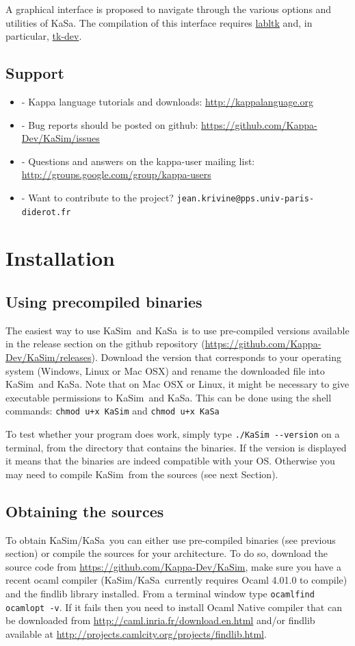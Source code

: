 \documentclass[11pt]{book}
\def\KaSim{\textsf{KaSim}}
\def\KaSa{\textsf{KaSa}}
\def\ttt#1{\texttt{#1}}
\def\ITE#1{\begin{itemize}#1\end{itemize}}
\def\dd{-\hspace{0.001cm}-}
\begin{document}
A graphical interface is proposed to navigate through the various options and utilities  of \KaSa. The compilation of this interface requires \href{https://forge.ocamlcore.org/projects/labltk/}{labltk} and, in particular,  \href{http://www.tcl.tk/}{tk-dev}.


\section{Support}
\ITE{
\item[-] Kappa language tutorials and downloads: \url{http://kappalanguage.org}
\item[-] Bug reports should be posted on github: \url{https://github.com/Kappa-Dev/KaSim/issues}
\item[-] Questions and answers on the kappa-user mailing list: \url{http://groups.google.com/group/kappa-users}
\item[-] Want to contribute to the project? \ttt{jean.krivine@pps.univ-paris-diderot.fr}
}

\chapter{Installation}\label{chap:install}

\section{Using precompiled binaries}
The easiest way to use \KaSim~and \KaSa~is to use pre-compiled versions available in the release section on the github repository (\url{https://github.com/Kappa-Dev/KaSim/releases}). Download the version that corresponds to your operating system (Windows, Linux or Mac OSX) and rename the downloaded file into \KaSim~and \KaSa. Note that on Mac OSX or Linux, it might be necessary to give executable permissions to \KaSim~and \KaSa. This can be done using the shell commands:
\ttt{chmod u+x KaSim} and \ttt{chmod u+x KaSa}

To test whether your program does work, simply type \ttt{./KaSim \dd version} on a terminal, from the directory that contains the binaries. If the version is displayed it means that the binaries are indeed compatible with your OS. Otherwise you may need to compile \KaSim~from the sources (see next Section).

\section{Obtaining the sources}\label{sec:sources}
To obtain \KaSim/\KaSa~you can either use pre-compiled binaries (see previous section)
or compile the sources for your architecture. To do so, download the source code
from \url{https://github.com/Kappa-Dev/KaSim}, make sure you have a recent ocaml
compiler (\KaSim/\KaSa~currently requires Ocaml 4.01.0 to compile) and the findlib library
installed. From a terminal window type \ttt{ocamlfind ocamlopt -v}. If it fails
then you need to install Ocaml Native compiler that can be downloaded from
\url{http://caml.inria.fr/download.en.html} and/or findlib available at
\url{http://projects.camlcity.org/projects/findlib.html}.
\end{document}
